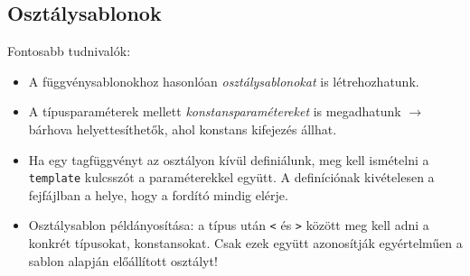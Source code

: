 \documentclass[usenames,dvipsnames,aspectratio=169]{beamer}
\begin{document}
\subsection{Osztálysablonok}

\begin{frame}
    Fontosabb tudnivalók:
    \begin{itemize}
        \item A függvénysablonokhoz hasonlóan \emph{osztálysablonokat} is létrehozhatunk.
        \item A típusparaméterek mellett \emph{konstansparamétereket} is megadhatunk $\to$ bárhova helyettesíthetők, ahol konstans kifejezés állhat.
        \item Ha egy tagfüggvényt az osztályon kívül definiálunk, meg kell ismételni a \texttt{template} kulcsszót a paraméterekkel együtt. A definíciónak kivételesen a fejfájlban a helye, hogy a fordító mindig elérje.
        \item Osztálysablon példányosítása: a típus után \texttt{<} és \texttt{>} között meg kell adni a konkrét típusokat, konstansokat. Csak ezek együtt azonosítják egyértelműen a sablon alapján előállított osztályt!
    \end{itemize}
\end{frame}

\begin{frame}
    \begin{exampleblock}{}
        
    \end{exampleblock}
\end{frame}

\begin{frame}
    \begin{exampleblock}{}
        \small
        
    \end{exampleblock}
\end{frame}

\begin{frame}
    \begin{exampleblock}{}
        
    \end{exampleblock}
\end{frame}

\begin{frame}
    \begin{exampleblock}{}
        
    \end{exampleblock}
\end{frame}
\end{document}
